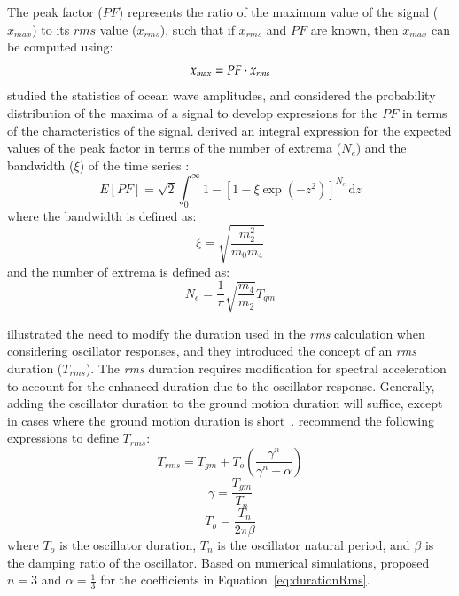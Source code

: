 \documentclass[11pt]{report}
\newcommand{\ud}{\,\mathrm{d}}
\begin{document}
The peak factor ($PF$) represents the ratio of the maximum value of the signal ($x_{max}$) to its
$rms$ value ($x_{rms}$), such that if $x_{rms}$ and $PF$ are known, then $x_{max}$ can be computed
using:
\begin{equation}
  x_{max} = PF \cdot x_{rms}
  \label{eq:rvt:max}
  \index{random vibration theory!peak factor}
\end{equation}
\citet{cartwright:56} studied the statistics of ocean wave amplitudes, and considered the
probability distribution of the maxima of a signal to develop expressions for the $PF$ in terms of
the characteristics of the signal.  \citet{cartwright:56} derived an integral expression for the
expected values of the peak factor in terms of the number of extrema ($N_e$) and the bandwidth
($\xi$) of the time series \citep{boore:03}:
\begin{equation}
  E[PF] = \sqrt{2} \int_0^{\infty} 1 - \left[ 1 - \xi\exp\left( -z^2 \right) \right]^{N_e} \ud z
  \label{eq:rvt:peakFactor}
\end{equation}
where the bandwidth is defined as:
\begin{equation}
  \xi = \sqrt{\frac{m_2^2}{m_0 m_4}}
  \label{eq:rvt:bandWidth}
\end{equation}
and the number of extrema is defined as:
\begin{equation}
  N_e = \frac{1}{\pi} \sqrt{\frac{m_4}{m_2}} T_{gm}
  \label{eq:rvt:numExtrema}
\end{equation}

\citet{boore:84} illustrated the need to modify the duration used in the \emph{rms} calculation when
considering oscillator responses, and they introduced the concept of an \emph{rms} duration
($T_{rms}$).  The \emph{rms} duration requires modification for spectral acceleration to account for
the enhanced duration due to the oscillator response.  Generally, adding the oscillator duration to
the ground motion duration will suffice, except in cases where the ground motion duration is
short~\citep{boore:84}.  \citet{boore:84} recommend the following expressions to define $T_{rms}$:
\begin{equation}
  T_{rms} = T_{gm} + T_o \left( \frac{\gamma^n}{\gamma^n + \alpha} \right)
  \label{eq:durationRms}
\end{equation}
\begin{equation}
  \gamma = \frac{T_{gm}}{T_n}
\end{equation}
\begin{equation}
  T_o = \frac{T_n}{2\pi\beta}
\end{equation}
where $T_o$ is the oscillator duration, $T_n$ is the oscillator natural period, and $\beta$ is the
damping ratio of the oscillator.  Based on numerical simulations, \citet{boore:84} proposed $n=3$
and $\alpha=\frac{1}{3}$ for the coefficients in Equation~\ref{eq:durationRms}.
\end{document}

